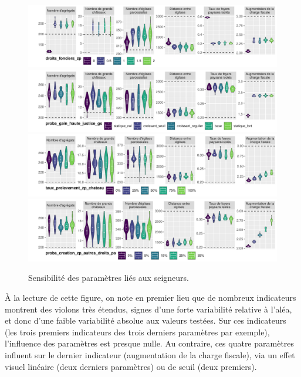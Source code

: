 \begin{figure}[H]
	\centering
	\includegraphics[width=\linewidth]{img/sensib/sensibilite_droits_fonciers_zp.pdf}
	\includegraphics[width=\linewidth]{img/sensib/sensibilite_proba_gain_haute_justice_gs.pdf}
	\includegraphics[width=\linewidth]{img/sensib/sensibilite_taux_prelevement_zp_chateau.pdf}
	\includegraphics[width=\linewidth]{img/sensib/sensibilite_proba_creation_zp_autres_droits_ps.pdf}
	\caption{Sensibilité des paramètres liés aux seigneurs.}
	\label{fig:sensib-seigneurs}
\end{figure}

À la lecture de cette figure, on note en premier lieu que de nombreux indicateurs montrent des \og violons\fg{} très étendus, signes d'une forte variabilité relative à l'aléa, et donc d'une faible variabilité absolue aux valeurs testées.
Sur ces indicateurs (les trois premiers indicateurs des trois derniers paramètres par exemple), l'influence des paramètres est presque nulle.
Au contraire, ces quatre paramètres influent sur le dernier indicateur (augmentation de la charge fiscale), via un effet visuel linéaire (deux derniers paramètres) ou de seuil (deux premiers).

